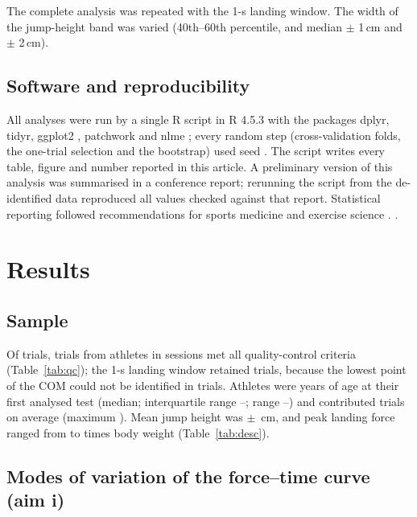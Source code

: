 The complete analysis was repeated with the 1-s landing window. The width of the jump-height band was varied (40th--60th percentile, and median $\pm$ 1\,cm and $\pm$ 2\,cm).

\subsection{Software and reproducibility}

All analyses were run by a single R script in R 4.5.3 \citep{rcore2026} with the packages dplyr, tidyr, ggplot2 \citep{wickham2016}, patchwork and nlme \citep{pinheiro2000}; every random step (cross-validation folds, the one-trial selection and the bootstrap) used seed \seedValue. The script writes every table, figure and number reported in this article. A preliminary version of this analysis was summarised in a conference report; rerunning the script from the de-identified data reproduced all \nReproTotal{} values checked against that report. Statistical reporting followed recommendations for sports medicine and exercise science \citep{hopkins2009}. .

\section{Results}

\subsection{Sample}

Of \nTrialsAll{} trials, \nTrials{} trials from \nAth{} athletes in \nSess{} sessions met all quality-control criteria (Table~\ref{tab:qc}); the 1-s landing window retained \nTrialsS{} trials, because the lowest point of the COM could not be identified in \nLowcomMissing{} trials. Athletes were \ageMedian{} years of age at their first analysed test (median; interquartile range \ageQone--\ageQthree{}; range \ageMin--\ageMax) and contributed \trialsPerAthMean{} trials on average (maximum \trialsPerAthMax). Mean jump height was \jhMean{} $\pm$ \jhSD{}\,cm, and peak landing force ranged from \lpfMin{} to \lpfMax{} times body weight (Table~\ref{tab:desc}).



\subsection{Modes of variation of the force--time curve (aim i)}

